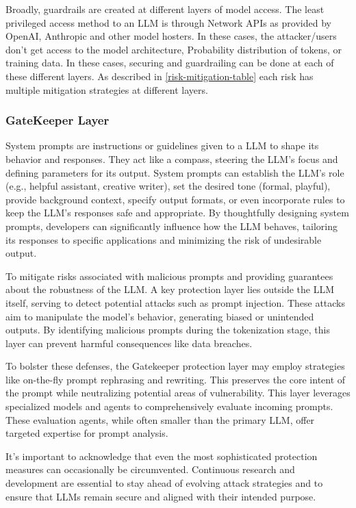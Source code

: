 \documentclass[11pt]{article}
\begin{document}
Broadly, guardrails are created at different layers of model access. The least privileged access method to an LLM is through Network APIs as provided by OpenAI, Anthropic and other model hosters.
In these cases, the attacker/users don't get access to the model architecture, Probability distribution of tokens, or training data. In these cases, securing and guardrailing can be done at each of these different layers. As described in \ref{risk-mitigation-table} each risk has multiple mitigation strategies at different layers.

\subsubsection{ GateKeeper Layer }

System prompts are instructions or guidelines given to a LLM to shape its behavior and responses. They act like a compass, steering the LLM's focus and defining parameters for its output. System prompts can establish the LLM's role (e.g., helpful assistant, creative writer), set the desired tone (formal, playful), provide background context, specify output formats, or even incorporate rules to keep the LLM's responses safe and appropriate. By thoughtfully designing system prompts, developers can significantly influence how the LLM behaves, tailoring its responses to specific applications and minimizing the risk of undesirable output.

To mitigate risks associated with malicious prompts and providing guarantees about the robustness of the LLM. A key protection layer lies outside the LLM itself, serving to detect potential attacks such as prompt injection. These attacks aim to manipulate the model's behavior, generating  biased or unintended outputs. By identifying malicious prompts during the tokenization stage, this layer can prevent harmful consequences like data breaches.

To bolster these defenses, the Gatekeeper protection layer may employ strategies like on-the-fly prompt rephrasing and rewriting. This preserves the core intent of the prompt while neutralizing potential areas of vulnerability.  This layer leverages specialized models and agents to comprehensively evaluate incoming prompts. These evaluation agents, while often smaller than the primary LLM, offer targeted expertise for prompt analysis.

It's important to acknowledge that even the most sophisticated protection measures can occasionally be circumvented.  Continuous research and development are essential to stay ahead of evolving attack strategies and to ensure that LLMs remain secure and aligned with their intended purpose.
\end{document}
